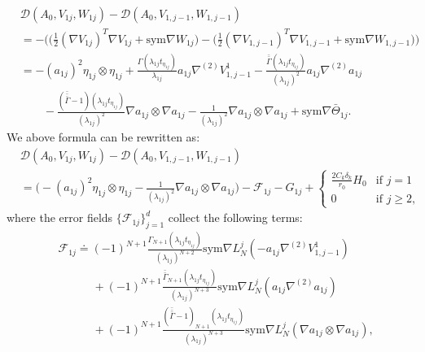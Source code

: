 \documentclass[reqno,twoside,11pt]{amsart}
\newcommand{\sym}{\mathrm{sym}}
\newcommand*{\dbar}[1]{\bar{\bar{#1}}}
\newcommand*{\tbar}[1]{\bar{\dbar{#1}}}
\numberwithin{equation}{section}
\theoremstyle{plain}
\theoremstyle{definition}
\begin{document}
\begin{equation*}
\begin{split}
& \mathcal{D}(A_0, V_{1j}, W_{1j}) - \mathcal{D}(A_0, V_{1,j-1},
W_{1,j-1}) \\ & = -\Big(\big(\frac{1}{2}(\nabla V_{1j})^T \nabla V_{1j} +
\sym\nabla W_{1j}\big) - \big(\frac{1}{2}(\nabla V_{1,j-1})^T \nabla V_{1,j-1} +
\sym\nabla W_{1,j-1}\big)\Big)\\ & = - (a_{1j})^2\eta_{1j}\otimes\eta_{1j} + 
\frac{\Gamma(\lambda_{1j}t_{\eta_{1j}})}{\lambda_{1j}} a_{1j}\nabla^{(2)}V_{1,{j-1}}^1 
- \frac{\dbar\Gamma(\lambda_{1j}t_{\eta_{1j}})}{(\lambda_{1j})^{2}}  
a_{1j}\nabla^{(2)} a_{1j} \\ & \qquad - \frac{(\tbar\Gamma-1)(\lambda_{1j}t_{\eta_{1j}})}{(\lambda_{1j})^{2}}  
\nabla a_{1j}\otimes \nabla a_{1j} - \frac{1}{(\lambda_{1j})^{2}}  
\nabla a_{1j}\otimes \nabla a_{1j} +\sym\nabla\bar\Theta_{1j}.
\end{split}
\end{equation*}
We above formula can be rewritten as:
\begin{equation}\label{def2}
\begin{split}
& \mathcal{D}(A_0, V_{1j}, W_{1j}) - \mathcal{D}(A_0, V_{1,j-1},
W_{1,j-1}) \\ & = \Big( - (a_{1j})^2\eta_{1j}\otimes\eta_{1j} -
\frac{1}{(\lambda_{1j})^{2}}  
\nabla a_{1j}\otimes \nabla a_{1j} \Big) - \mathcal{F}_{1j} - G_{1j} +
\left\{\begin{array}{ll} \displaystyle{\frac{2C_k\delta_k}{r_0}H_0} &\mbox{if }
    j=1\\ 0& \mbox{if } j\geq 2,\end{array}\right.
\end{split}
\end{equation}
where the error fields $\{\mathcal{F}_{1j}\}_{j=1}^d$ collect the following terms:
\begin{equation}\label{F1j}
\begin{split}
& \mathcal{F}_{1j}\doteq  (-1)^{N+1} \frac{\Gamma_{N+1}(\lambda_{1j}t_{\eta_{1j}})}{(\lambda_{1j})^{N+2}} 
\sym\nabla L_N^j(-a_{1j}\nabla^{(2)}V_{1,{j-1}}^1) \\ & \qquad\quad + (-1)^{N+1}
\frac{\dbar\Gamma_{N+1}(\lambda_{1j}t_{\eta_{1j}})}{(\lambda_{1j})^{N+3}}  
\sym\nabla L_N^j(a_{1j}\nabla^{(2)} a_{1j}) \\ & \qquad\quad + (-1)^{N+1}
\frac{(\tbar\Gamma-1)_{N+1}(\lambda_{1j}t_{\eta_{1j}})}{(\lambda_{1j})^{N+3}}  
\sym\nabla L_N^j(\nabla a_{1j}\otimes \nabla a_{1j}),
\end{split}
\end{equation}
\end{document}
